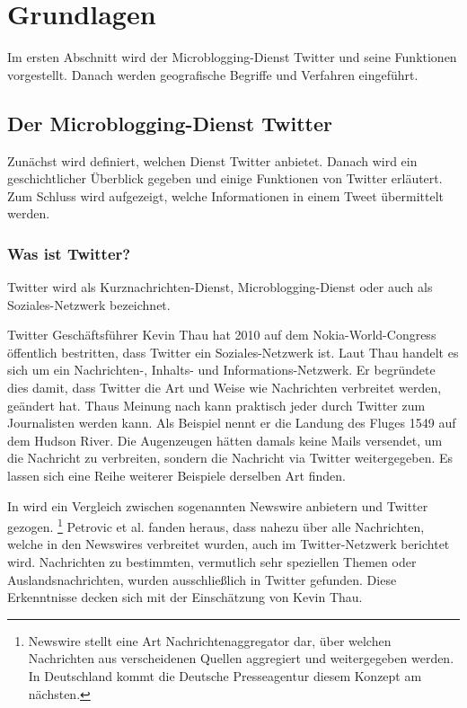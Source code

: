 \chapter{Grundlagen} \label{chp:Grundlagen}  
Im ersten Abschnitt wird der Microblogging-Dienst Twitter und seine Funktionen vorgestellt.
Danach werden geografische Begriffe und Verfahren eingeführt.


	\section{Der Microblogging-Dienst Twitter} 
	
		Zunächst wird definiert, welchen Dienst Twitter anbietet. 
		Danach wird ein geschichtlicher Überblick gegeben und einige Funktionen von Twitter erläutert.
		Zum Schluss wird aufgezeigt, welche Informationen in einem Tweet übermittelt werden.

		\subsection{Was ist Twitter?}
		
			Twitter wird als Kurznachrichten-Dienst, Microblogging-Dienst oder auch als Soziales-Netzwerk bezeichnet. 

			Twitter Geschäftsführer Kevin Thau hat 2010 auf dem Nokia-World-Congress öffentlich bestritten, dass Twitter ein Soziales-Netzwerk ist. 
			Laut Thau handelt es sich um ein Nachrichten-, Inhalts- und Informations-Netzwerk. 
			Er begründete dies damit, dass Twitter die Art und Weise wie Nachrichten verbreitet werden, geändert hat.
			Thaus Meinung nach kann praktisch jeder durch Twitter zum Journalisten werden kann. 
			Als Beispiel nennt er die Landung des Fluges 1549 auf dem Hudson River. 
			Die Augenzeugen hätten damals keine Mails versendet, um die Nachricht zu verbreiten, sondern die Nachricht via Twitter weitergegeben.
			Es lassen sich eine Reihe weiterer Beispiele derselben Art finden. 

			In \cite{Petrovic2013} wird ein Vergleich zwischen sogenannten Newswire anbietern und Twitter gezogen. \footnote{Newswire stellt eine Art Nachrichtenaggregator dar, über welchen Nachrichten aus verscheidenen Quellen aggregiert und weitergegeben werden. In Deutschland kommt die Deutsche Presseagentur diesem Konzept am nächsten.}
			Petrovic et al. fanden heraus, dass nahezu über alle Nachrichten, welche in den Newswires verbreitet wurden, auch im Twitter-Netzwerk berichtet wird.
			Nachrichten zu bestimmten, vermutlich sehr speziellen Themen oder Auslandsnachrichten, wurden ausschließlich in Twitter gefunden. 
			Diese Erkenntnisse decken sich mit der Einschätzung von Kevin Thau.

